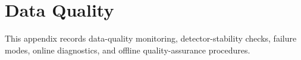 \section{Data Quality}

This appendix records data-quality monitoring, detector-stability checks,
failure modes, online diagnostics, and offline quality-assurance procedures.

